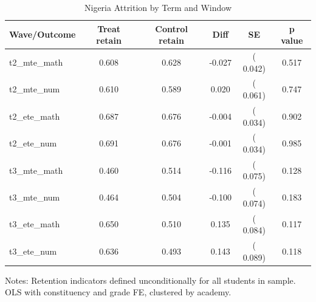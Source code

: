 \begin{table}[!htbp]
\centering
\caption{Nigeria Attrition by Term and Window}
\label{tab:ng_attrition}
\begin{threeparttable}
\begin{tabular}[t]{lccccc}
\toprule
Wave/Outcome & Treat retain & Control retain & Diff & SE & p value \\
\midrule
t2\_mte\_math &   0.608 &   0.628 &  -0.027 & (  0.042) & 0.517 \\
t2\_mte\_num &   0.610 &   0.589 &   0.020 & (  0.061) & 0.747 \\
t2\_ete\_math &   0.687 &   0.676 &  -0.004 & (  0.034) & 0.902 \\
t2\_ete\_num &   0.691 &   0.676 &  -0.001 & (  0.034) & 0.985 \\
t3\_mte\_math &   0.460 &   0.514 &  -0.116 & (  0.075) & 0.128 \\
t3\_mte\_num &   0.464 &   0.504 &  -0.100 & (  0.074) & 0.183 \\
t3\_ete\_math &   0.650 &   0.510 &   0.135 & (  0.084) & 0.117 \\
t3\_ete\_num &   0.636 &   0.493 &   0.143 & (  0.089) & 0.118 \\
\bottomrule
\end{tabular}
\begin{tablenotes}[para]
\item Notes: Retention indicators defined unconditionally for all students in sample.
OLS with constituency and grade FE, clustered by academy.
\end{tablenotes}
\end{threeparttable}
\end{table}
